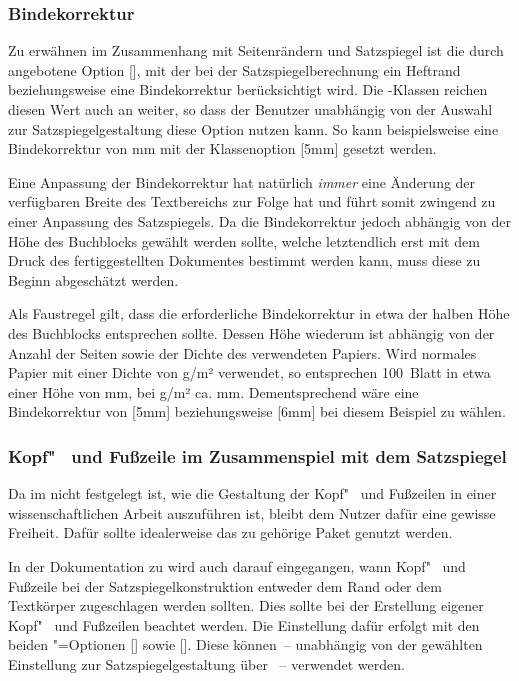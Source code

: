 \subsubsection{Bindekorrektur}
%
%
Zu erwähnen im Zusammenhang mit Seitenrändern und Satzspiegel ist die durch 
 angebotene Option [], mit der bei 
der Satzspiegelberechnung ein Heftrand beziehungsweise eine Bindekorrektur 
berücksichtigt wird. Die \TUDScript-Klassen reichen diesen Wert auch an 
 weiter, so dass der Benutzer unabhängig von der Auswahl zur 
Satzspiegelgestaltung diese Option nutzen kann. So kann beispielsweise eine 
Bindekorrektur von \unit[5]{mm} mit der Klassenoption [5mm] 
gesetzt werden.

Eine Anpassung der Bindekorrektur hat natürlich \emph{immer} eine Änderung der 
verfügbaren Breite des Textbereichs zur Folge hat und führt somit zwingend zu 
einer Anpassung des Satzspiegels. Da die Bindekorrektur jedoch abhängig von der 
Höhe des Buchblocks gewählt werden sollte, welche letztendlich erst mit dem 
Druck des fertiggestellten Dokumentes bestimmt werden kann, muss diese zu 
Beginn abgeschätzt werden.
%
\begin{Example}
Als Faustregel gilt, dass die erforderliche Bindekorrektur in etwa der halben 
Höhe des Buchblocks entsprechen sollte. Dessen Höhe wiederum ist abhängig von 
der Anzahl der Seiten sowie der Dichte des verwendeten Papiers. Wird normales 
Papier mit einer Dichte von \unit[80]{g/m²} verwendet, so entsprechen 100~Blatt 
in etwa einer Höhe von \unit[10]{mm}, bei \unit[100]{g/m²} ca. \unit[12]{mm}. 
Dementsprechend wäre eine Bindekorrektur von [5mm] beziehungsweise 
[6mm] bei diesem Beispiel zu wählen.
\end{Example}

\subsubsection{Kopf"~ und Fußzeile im Zusammenspiel mit dem Satzspiegel}
%
%
Da im \CD nicht festgelegt ist, wie die Gestaltung der Kopf"~ und Fußzeilen in 
einer wissenschaftlichen Arbeit auszuführen ist, bleibt dem Nutzer dafür eine 
gewisse Freiheit. Dafür sollte idealerweise das zu \KOMAScript{} gehörige Paket 
 genutzt werden. 

In der Dokumentation zu  wird auch darauf eingegangen, wann 
Kopf"~ und Fußzeile bei der Satzspiegelkonstruktion entweder dem Rand oder dem 
Textkörper zugeschlagen werden sollten. Dies sollte bei der Erstellung eigener 
Kopf"~ und Fußzeilen beachtet werden. Die Einstellung dafür erfolgt mit den 
beiden \KOMAScript"=Optionen [\PBoolean] sowie 
[\PBoolean]. Diese können~-- unabhängig von der gewählten 
Einstellung zur Satzspiegelgestaltung über ~-- verwendet 
werden.


